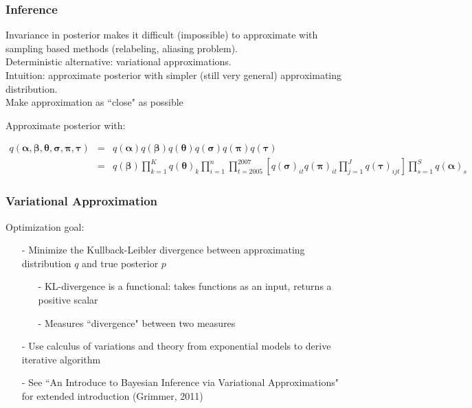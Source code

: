 \documentclass{beamer}
\numberwithin{equation}{section}
\begin{document}
\begin{frame}
\frametitle{Inference}

Invariance in posterior makes it difficult (impossible) to
approximate with sampling based methods (relabeling, aliasing problem).  \\

Deterministic alternative: variational approximations.  \\

Intuition: approximate posterior with simpler (still very general)
approximating distribution. \\

Make approximation as ``close" as possible\\

\end{frame}

\begin{frame}
Approximate posterior with:

\scriptsize
\begin{eqnarray}
q(\boldsymbol{\alpha}, \boldsymbol{\beta}, \boldsymbol{\theta},
\boldsymbol{\sigma}, \boldsymbol{\pi}, \boldsymbol{\tau}) & = &
q(\boldsymbol{\alpha})q(\boldsymbol{\beta})q( \boldsymbol{\theta})q(\boldsymbol{\sigma})q(\boldsymbol{\pi})q(\boldsymbol{\tau}) \nonumber \\
& = & q(\boldsymbol{\beta} ) \prod_{k=1}^{K}
q(\boldsymbol{\theta})_{k} \prod_{i=1}^{n}
\prod_{t=2005}^{2007}\left[ q(\boldsymbol{\sigma})_{it}
q(\boldsymbol{\pi})_{it}
 \prod_{j=1}^{J} q(\boldsymbol{\tau})_{ijt} \right] \prod_{s=1}^{S} q(\boldsymbol{\alpha})_{s}
 \nonumber
\end{eqnarray}

\end{frame}


\begin{frame}
\frametitle{Variational Approximation} Optimization goal:
\begin{itemize}
\item[-] Minimize the Kullback-Leibler divergence
between approximating distribution $q$ and true posterior $p$
\begin{itemize}
\item[-] KL-divergence is a functional: takes
\alert{functions} as an input, returns a positive scalar
\item[-] Measures ``divergence" between two
measures
\end{itemize}
\item[-] Use calculus of variations and theory from
exponential models to derive iterative algorithm
\item[-] See ``An Introduce to Bayesian Inference via Variational
Approximations" for extended introduction (Grimmer, 2011)
\end{itemize}
\end{frame}
\end{document}
